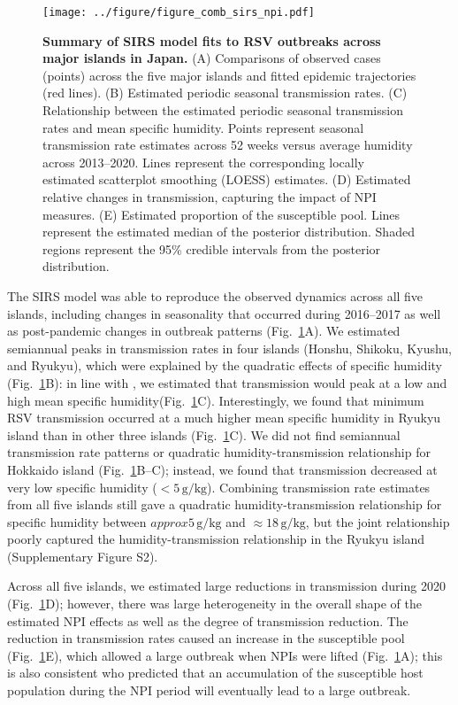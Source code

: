 \documentclass[12pt]{article}
\newcommand{\fref}[1]{Fig.~\ref{fig:#1}}
\begin{document}
\begin{figure}[!th]
\texttt{[image: ../figure/figure\_comb\_sirs\_npi.pdf]}
\caption{
\textbf{Summary of SIRS model fits to RSV outbreaks across major islands in Japan.}
(A) Comparisons of observed cases (points) across the five major islands and fitted epidemic trajectories (red lines).
(B) Estimated periodic seasonal transmission rates.
(C) Relationship between the estimated periodic seasonal transmission rates and mean specific humidity.
Points represent seasonal transmission rate estimates across 52 weeks versus average humidity across 2013--2020.
Lines represent the corresponding locally estimated scatterplot smoothing (LOESS) estimates.
(D) Estimated relative changes in transmission, capturing the impact of NPI measures.
(E) Estimated proportion of the susceptible pool.
Lines represent the estimated median of the posterior distribution.
Shaded regions represent the 95\% credible intervals from the posterior distribution.
}
\label{fig:fig2}
\end{figure}

The SIRS model was able to reproduce the observed dynamics across all five islands, including changes in seasonality that occurred during 2016--2017 as well as post-pandemic changes in outbreak patterns (\fref{fig2}A).
We estimated semiannual peaks in transmission rates in four islands (Honshu, Shikoku, Kyushu, and Ryukyu), which were explained by the quadratic effects of specific humidity (\fref{fig2}B):
in line with \cite{baker2019epidemic}, we estimated that transmission would peak at a low and high mean specific humidity(\fref{fig2}C).
Interestingly, we found that minimum RSV transmission occurred at a much higher mean specific humidity in Ryukyu island than in other three islands (\fref{fig2}C).
We did not find semiannual transmission rate patterns or quadratic humidity-transmission relationship for Hokkaido island (\fref{fig2}B--C);
instead, we found that transmission decreased at very low specific humidity ($<5\,\mathrm{g/kg}$).
Combining transmission rate estimates from all five islands still gave a quadratic humidity-transmission relationship for specific humidity between $approx5\,\mathrm{g/kg}$ and $\approx18\,\mathrm{g/kg}$, but the joint relationship poorly captured the humidity-transmission relationship in the Ryukyu island (Supplementary Figure S2).

Across all five islands, we estimated large reductions in transmission during 2020  (\fref{fig2}D);
however, there was large heterogeneity in the overall shape of the estimated NPI effects as well as the degree of transmission reduction.
The reduction in transmission rates caused an increase in the susceptible pool (\fref{fig2}E), which allowed a large outbreak when NPIs were lifted (\fref{fig2}A);
this is also consistent \cite{baker2019epidemic} who predicted that an accumulation of the susceptible host population during the NPI period will eventually lead to a large outbreak.
\end{document}
